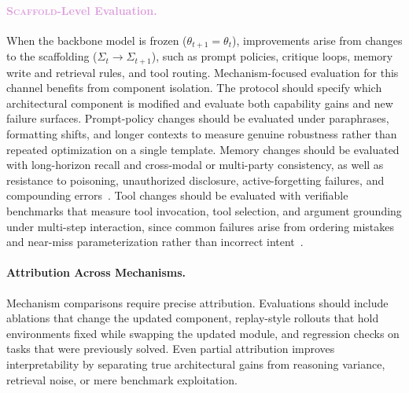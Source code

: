 \paragraph{\textcolor{Plum}{\textsc{Scaffold}-Level Evaluation.}}
When the backbone model is frozen ($\theta_{t+1} = \theta_t$), improvements arise from changes to the scaffolding ($\Sigma_t \rightarrow \Sigma_{t+1}$), such as prompt policies, critique loops, memory write and retrieval rules, and tool routing. Mechanism-focused evaluation for this channel benefits from component isolation. The protocol should specify which architectural component is modified and evaluate both capability gains and new failure surfaces. Prompt-policy changes should be evaluated under paraphrases, formatting shifts, and longer contexts to measure genuine robustness rather than repeated optimization on a single template. 
Memory changes should be evaluated with long-horizon recall and cross-modal or multi-party consistency, as well as resistance to poisoning, unauthorized disclosure, active-forgetting failures, and compounding errors~\citep{yang2025drunkagentstealthymemorycorruption, zhu2026h2hmemmultimodalmemorybenchmark, ren2026gatemembenchmarkingmemorygovernance}.
Tool changes should be evaluated with verifiable benchmarks that measure tool invocation, tool selection, and argument grounding under multi-step interaction, since common failures arise from ordering mistakes and near-miss parameterization rather than incorrect intent~\citep{patil2025the, huang2024metatoolbenchmarklargelanguage, shen2024taskbenchbenchmarkinglargelanguage, wang2024mintevaluatingllmsmultiturn}.

\paragraph{Attribution Across Mechanisms.}
Mechanism comparisons require precise attribution. Evaluations should include ablations that change the updated component, replay-style rollouts that hold environments fixed while swapping the updated module, and regression checks on tasks that were previously solved. Even partial attribution  improves interpretability by separating true architectural gains from reasoning variance, retrieval noise, or mere benchmark exploitation.



